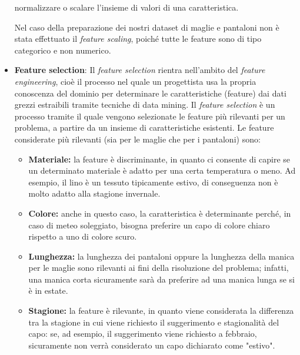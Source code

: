 \documentclass[a4paper, 11pt, oneside]{report}
\begin{document}
\begin{itemize}
                    normalizzare o scalare l'insieme di valori di una caratteristica.
                    \par \noindent Nel caso della preparazione dei nostri dataset di maglie e pantaloni non è stata effettuato
                    il  \textit{feature scaling}, poiché tutte le feature sono di tipo categorico e non numerico.
                    \item \textbf{Feature selection}: Il \textit{feature selection} rientra nell'ambito del \textit{feature engineering},
                    cioè il processo nel quale un progettista usa la propria conoscenza del dominio per determinare le caratteristiche
                    (feature) dai dati grezzi estraibili tramite tecniche di data mining. Il \textit{feature selection} è un processo tramite
                    il quale vengono selezionate le feature più rilevanti per un problema, a partire da un insieme di caratteristiche esistenti.
                    Le feature considerate più rilevanti (sia per le maglie che per i pantaloni) sono:
                    \begin{itemize}
                        \item \textbf{Materiale:} la feature è discriminante, in quanto ci consente di capire se un determinato materiale è adatto per
                        una certa temperatura o meno. Ad esempio, il lino è un tessuto tipicamente estivo, di conseguenza non è molto adatto alla
                        stagione invernale.
                        \item \textbf{Colore:} anche in questo caso, la caratteristica è determinante perché, in caso di meteo soleggiato, bisogna preferire
                        un capo di colore chiaro rispetto a uno di colore scuro.
                        \item \textbf{Lunghezza:} la lunghezza dei pantaloni oppure la lunghezza della manica per le maglie sono rilevanti ai fini della
                        risoluzione del problema; infatti, una manica corta sicuramente sarà da preferire ad una manica lunga se si è in estate.
                        \item \textbf{Stagione:} la feature è rilevante, in quanto viene considerata la differenza tra la stagione in cui viene richiesto il
                        suggerimento e stagionalità del capo: se, ad esempio, il suggerimento viene richiesto a febbraio, sicuramente non verrà considerato
                        un capo dichiarato come "estivo".
                    \end{itemize}

\end{itemize}
\end{document}
